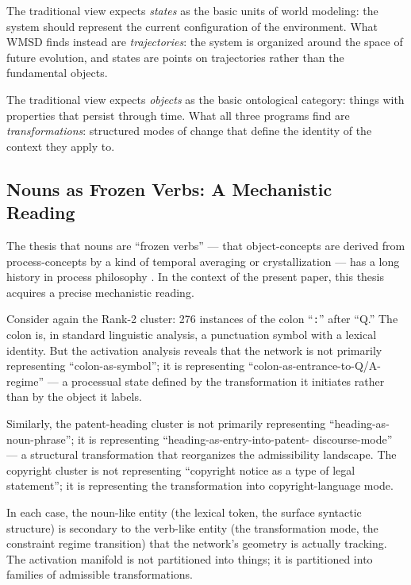 \documentclass[12pt, a4paper]{article}
\theoremstyle{plain}
\theoremstyle{definition}
\theoremstyle{remark}
\begin{document}
The traditional view expects \emph{states} as the basic units of world
modeling: the system should represent the current configuration of the
environment. What WMSD finds instead are \emph{trajectories}: the system is
organized around the space of future evolution, and states are points on
trajectories rather than the fundamental objects.

The traditional view expects \emph{objects} as the basic ontological category:
things with properties that persist through time. What all three programs find
are \emph{transformations}: structured modes of change that define the identity
of the context they apply to.

\subsection{Nouns as Frozen Verbs: A Mechanistic Reading}

The thesis that nouns are ``frozen verbs'' --- that object-concepts are derived
from process-concepts by a kind of temporal averaging or crystallization ---
has a long history in process philosophy \cite{kauffman1993origins,
wolfram2002nks}. In the context of the present paper, this thesis acquires
a precise mechanistic reading.

Consider again the Rank-2 cluster: 276 instances of the colon ``\texttt{:}''
after ``Q.'' The colon is, in standard linguistic analysis, a punctuation
symbol with a lexical identity. But the activation analysis reveals that the
network is not primarily representing ``colon-as-symbol''; it is representing
``colon-as-entrance-to-Q/A-regime'' --- a processual state defined by the
transformation it initiates rather than by the object it labels.

Similarly, the patent-heading cluster is not primarily representing
``heading-as-noun-phrase''; it is representing ``heading-as-entry-into-patent-
discourse-mode'' --- a structural transformation that reorganizes the admissibility
landscape. The copyright cluster is not representing ``copyright notice as a
type of legal statement''; it is representing the transformation into
copyright-language mode.

In each case, the noun-like entity (the lexical token, the surface syntactic
structure) is secondary to the verb-like entity (the transformation mode, the
constraint regime transition) that the network's geometry is actually tracking.
The activation manifold is not partitioned into things; it is partitioned into
families of admissible transformations.
\end{document}
